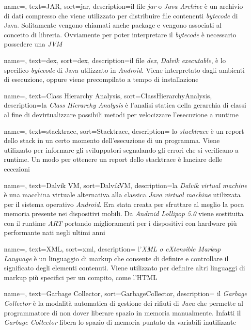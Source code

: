 {
	name=,
	text=JAR,
	sort=jar,
	description={il file \emph{jar} o \emph{Java Archive} è un archivio di dati compresso che viene utilizzato per distribuire file contenenti \emph{bytecode} di Java. Solitamente vengono chiamati anche package e vengono associati al concetto di libreria. Ovviamente per poter interpretare il \emph{bytecode} è necessario possedere una \emph{JVM} }
}


{
	name=,
	text=dex,
	sort=dex,
	description={il file \emph{dex}, \emph{Dalvik executable}, è lo specifico \emph{bytecode} di Java utilizzato in \emph{Android}. Viene interpretato dagli ambienti di esecuzione, oppure viene precompilato a tempo di installazione }
}

{
	name=,
	text=Class Hierarchy Analysis,
	sort=ClassHierarchyAnalysis,
	description={la \emph{Class Hierarchy Analysis} è l'analisi statica della gerarchia di classi al fine di devirtualizzare possibili metodi per velocizzare l'esecuzione a runtime }
}

{
	name=,
	text=stacktrace,
	sort=Stacktrace,
	description={ lo \emph{stacktrace} è un report dello stack in un certo momento dell'esecuzione di un programma. Viene utilizzato per informare gli sviluppatori segnalando gli errori che si verificano a runtime. Un modo per ottenere un report dello stacktrace è lanciare delle eccezioni }
}

{
	name=,
	text=Dalvik VM,
	sort=DalvikVM,
	description={la \emph{Dalvik virtual machine} è una macchina virtuale alternativa alla classica \emph{Java virtual machine} utilizzata per il sistema operativo \emph{Android}. Era stata creata per sfruttare al meglio la poca memoria presente nei dispositivi mobili. Da \emph{Android Lollipop 5.0} viene sostituita con il runtime \emph{ART} portando miglioramenti per i dispositivi con hardware più performante nati negli ultimi anni }
}

{
	name=,
	text=XML,
	sort=xml,
	description={ l'\emph{XML o eXtensible Markup Language} è un linguaggio di markup che consente di definire e controllare il significato degli elementi contenuti. Viene utilizzato per definire altri linguaggi di markup più specifici per un compito, come l'HTML }
}

{
	name=,
	text=Garbage Collector,
	sort=GarbageCollector,
	description={ il \emph{Garbage Collector} è la modalità automatica di gestione dei rifiuti di \emph{Java} che permette al programmatore di non dover liberare spazio in memoria manualmente. Infatti il \emph{Garbage Collector} libera lo spazio di memoria puntato da variabili inutilizzate }
}

